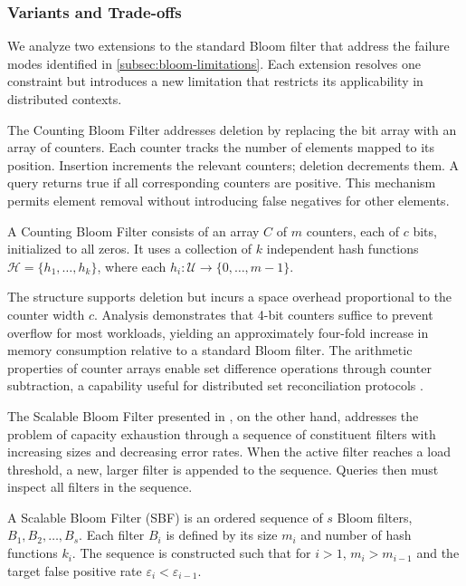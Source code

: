 \subsubsection{Variants and Trade-offs}

We analyze two extensions to the standard Bloom filter that address the failure modes identified in \ref{subsec:bloom-limitations}. Each extension resolves one constraint but introduces a new limitation that restricts its applicability in distributed contexts.

The Counting Bloom Filter \cite{Fan1998SummaryCA} addresses deletion by replacing the bit array with an array of counters. Each counter tracks the number of elements mapped to its position. Insertion increments the relevant counters; deletion decrements them. A query returns true if all corresponding counters are positive. This mechanism permits element removal without introducing false negatives for other elements.

\begin{definition} \label{def:counting-bloom}
    A Counting Bloom Filter consists of an array $C$ of $m$ counters, each of $c$ bits, initialized to all zeros. It uses a collection of $k$ independent hash functions $\mathcal{H} = \{h_1, \ldots, h_k\}$, where each $h_i : \mathcal{U} \to \{0, \ldots, m-1\}$.
\end{definition}

The structure supports deletion but incurs a space overhead proportional to the counter width $c$. Analysis \cite{Fan1998SummaryCA, Tarkoma2012TheoryAP} demonstrates that 4-bit counters suffice to prevent overflow for most workloads, yielding an approximately four-fold increase in memory consumption relative to a standard Bloom filter. The arithmetic properties of counter arrays enable set difference operations through counter subtraction, a capability useful for distributed set reconciliation protocols \cite{Guo2013SetRV}.

The Scalable Bloom Filter presented in \cite{Almeida2007ScalableBF}, on the other hand, addresses the problem of capacity exhaustion through a sequence of constituent filters with increasing sizes and decreasing error rates. When the active filter reaches a load threshold, a new, larger filter is appended to the sequence. Queries then must inspect all filters in the sequence.

\begin{definition} \label{def:scalable-bloom}
    A Scalable Bloom Filter (SBF) is an ordered sequence of $s$ Bloom filters, $B_1, B_2, \ldots, B_s$. Each filter $B_i$ is defined by its size $m_i$ and number of hash functions $k_i$. The sequence is constructed such that for $i > 1$, $m_i > m_{i-1}$ and the target false positive rate $\varepsilon_i < \varepsilon_{i-1}$.
\end{definition}

